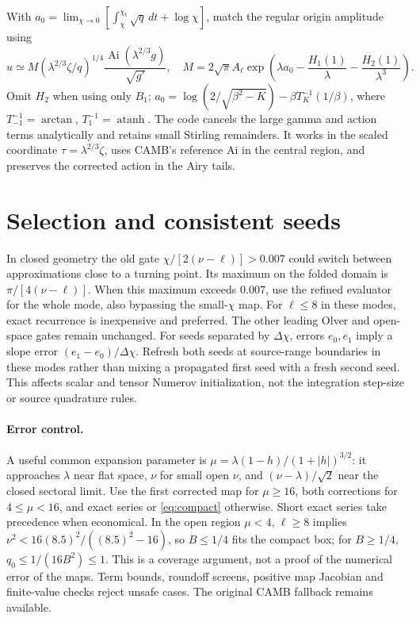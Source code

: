 \documentclass[10pt]{article}
\newcommand{\Ai}{\operatorname{Ai}}
\newcommand{\atanh}{\operatorname{atanh}}
\begin{document}
With $a_0=\lim_{\chi\to0}[\int_\chi^{\chi_t}\sqrt q\,dt+\log\chi]$,
match the regular origin amplitude using
\begin{equation}
 u\simeq M(\lambda^{2/3}\zeta/q)^{1/4}
 \frac{\Ai(\lambda^{2/3}g)}{\sqrt{g'}},\quad
 M=2\sqrt\pi A_\ell\exp\!\left(\lambda a_0-\frac{H_1(1)}{\lambda}
 -\frac{H_2(1)}{\lambda^3}\right).
\end{equation}
Omit $H_2$ when using only $B_1$; $a_0=\log(2/\sqrt{\beta^2-K})-\beta T_K^{-1}(1/\beta)$,
where $T_{-1}^{-1}=\arctan$, $T_1^{-1}=\atanh$.
The code cancels the large gamma and action terms analytically and retains
small Stirling remainders. It works in the scaled coordinate
$\tau=\lambda^{2/3}\zeta$, uses CAMB's reference Ai in the central region,
and preserves the corrected action in the Airy tails.

\section{Selection and consistent seeds}\label{sec:gate}
In closed geometry the old gate $\chi/[2(\nu-\ell)]>0.007$ could switch
between approximations close to a turning point. Its maximum on the folded
domain is $\pi/[4(\nu-\ell)]$. When this maximum exceeds $0.007$, use the
refined evaluator for the whole mode, also bypassing the small-$\chi$ map.
For $\ell\leq8$ in these modes, exact recurrence is inexpensive and preferred.
The other leading Olver and open-space gates remain unchanged.
For seeds separated by $\Delta\chi$, errors $e_0,e_1$ imply a slope error
$(e_1-e_0)/\Delta\chi$. Refresh both seeds at source-range boundaries in
these modes rather than mixing a propagated first seed with a fresh second
seed. This affects scalar and tensor Numerov initialization, not the
integration step-size or source quadrature rules.

\paragraph{Error control.}
A useful common expansion parameter is
$\mu=\lambda(1-h)/(1+|h|)^{3/2}$: it approaches $\lambda$ near flat space,
$\nu$ for small open $\nu$, and $(\nu-\lambda)/\sqrt2$ near the closed
sectoral limit. Use the first corrected map for $\mu\geq16$, both
corrections for $4\leq\mu<16$, and exact series or \eqref{eq:compact} otherwise.
Short exact series take precedence when economical. In the open region
$\mu<4$, $\ell\geq8$ implies $\nu^2<16(8.5)^2/((8.5)^2-16)$, so
$B\leq1/4$ fits the compact box; for $B\geq1/4$, $q_0\leq1/(16B^2)\leq1$.
This is a coverage argument, not a proof of the numerical error of the maps.
Term bounds, roundoff screens, positive map Jacobian and finite-value checks
reject unsafe cases. The original CAMB fallback remains available.
\end{document}
